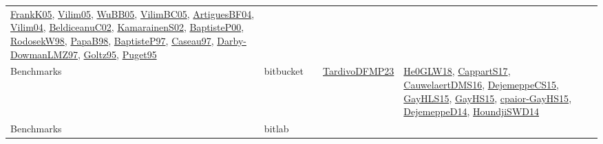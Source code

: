 {\begin{longtable}{llp{6cm}p{6cm}p{6cm}}
\href{papers/FrankK05.pdf}{FrankK05}\cite{FrankK05}, \href{papers/Vilim05.pdf}{Vilim05}\cite{Vilim05}, \href{papers/WuBB05.pdf}{WuBB05}\cite{WuBB05}, \href{articles/VilimBC05.pdf}{VilimBC05}\cite{VilimBC05}, \href{papers/ArtiguesBF04.pdf}{ArtiguesBF04}\cite{ArtiguesBF04}, \href{papers/Vilim04.pdf}{Vilim04}\cite{Vilim04}, \href{papers/BeldiceanuC02.pdf}{BeldiceanuC02}\cite{BeldiceanuC02}, \href{papers/KamarainenS02.pdf}{KamarainenS02}\cite{KamarainenS02}, \href{articles/BaptisteP00.pdf}{BaptisteP00}\cite{BaptisteP00}, \href{papers/RodosekW98.pdf}{RodosekW98}\cite{RodosekW98}, \href{articles/PapaB98.pdf}{PapaB98}\cite{PapaB98}, \href{papers/BaptisteP97.pdf}{BaptisteP97}\cite{BaptisteP97}, \href{papers/Caseau97.pdf}{Caseau97}\cite{Caseau97}, \href{articles/Darby-DowmanLMZ97.pdf}{Darby-DowmanLMZ97}\cite{Darby-DowmanLMZ97}, \href{papers/Goltz95.pdf}{Goltz95}\cite{Goltz95}, \href{papers/Puget95.pdf}{Puget95}\cite{Puget95}\\
Benchmarks & bitbucket &  & \href{papers/TardivoDFMP23.pdf}{TardivoDFMP23}\cite{TardivoDFMP23} & \href{papers/He0GLW18.pdf}{He0GLW18}\cite{He0GLW18}, \href{papers/CappartS17.pdf}{CappartS17}\cite{CappartS17}, \href{papers/CauwelaertDMS16.pdf}{CauwelaertDMS16}\cite{CauwelaertDMS16}, \href{papers/DejemeppeCS15.pdf}{DejemeppeCS15}\cite{DejemeppeCS15}, \href{papers/GayHLS15.pdf}{GayHLS15}\cite{GayHLS15}, \href{papers/GayHS15.pdf}{GayHS15}\cite{GayHS15}, \href{papers/cpaior-GayHS15.pdf}{cpaior-GayHS15}\cite{cpaior-GayHS15}, \href{papers/DejemeppeD14.pdf}{DejemeppeD14}\cite{DejemeppeD14}, \href{papers/HoundjiSWD14.pdf}{HoundjiSWD14}\cite{HoundjiSWD14}\\
Benchmarks & bitlab &  &  & \\

\end{longtable}}

